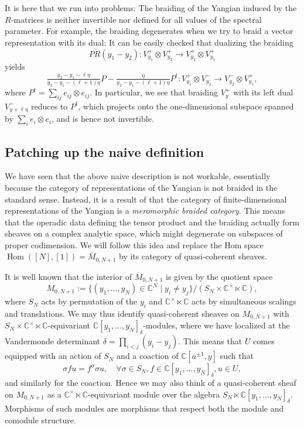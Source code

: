 \documentclass[11pt]{report}
\theoremstyle{definition}
\theoremstyle{remark}
\theoremstyle{remark}
\newcommand{\Hom}{\operatorname{Hom}}
\newcommand{\C}{\mathbb{C}}
\begin{document}
It is here that we run into problems: The braiding of the Yangian induced by the $R$-matrices is neither invertible nor defined for all values of the spectral parameter. For example, the braiding degenerates when we try to braid a vector representation with its dual: It can be easily checked that dualizing the braiding
\begin{equation*}
P \check R(y_1-y_2): V_{y_1}^+ \otimes V_{y_2}^+ \to V_{y_2}^+ \otimes V_{y_1}^+
\end{equation*}
yields
\begin{equation*}
\tfrac{y_2-y_1-\ell\eta}{y_2-y_1-(\ell+1)\eta} P - \tfrac{\eta}{y_2-y_1-(\ell+1)\eta} P^t: V_{y_1}^+ \otimes V_{y_2}^- \to V_{y_2}^- \otimes V_{y_1}^+,
\end{equation*}
where $P^t = \sum_{ij} e_{ij} \otimes e_{ij}$. In particular, we see that braiding $V_y^+$ with its left dual $V_{y+\ell\eta}^-$ reduces to $P^t$, which projects onto the one-dimensional subspace spanned by $\sum_i e_i \otimes e_i$, and is hence not invertible.

\subsection{Patching up the naive definition}

We have seen that the above naive description is not workable, essentially because the category of representations of the Yangian is not braided in the standard sense. Instead, it is a result of \cite{article:soibelman:1997} that the category of finite-dimensional representations of the Yangian is a \emph{meromorphic braided category}. This means that the operadic data defining the tensor product and the braiding actually form sheaves on a complex analytic space, which might degenerate on subspaces of proper codimension. We will follow this idea and replace the Hom space $\Hom([N],[1]) = \overline{M}_{0,N+1}$ by its category of quasi-coherent sheaves.

It is well known that the interior of $\overline{M}_{0,N+1}$ is given by the quotient space
\begin{equation*}
M_{0,N+1} := \{ (y_1,...,y_N) \in \C^N \mid y_i \neq y_j \}/(S_N \times \C^\times \ltimes \C),
\end{equation*}
where $S_N$ acts by permutation of the $y_i$ and $\C^\times \ltimes \C$ acts by simultaneous scalings and translations. We may thus identify quasi-coherent sheaves on $M_{0,N+1}$ with $S_N \times \C^\times \ltimes \C$-equivariant $\C[y_1,...,y_N]_\delta$-modules, where we have localized at the Vandermonde determinant $\delta = \prod_{i<j} (y_i-y_j)$. This means that $U$ comes equipped with an action of $S_N$ and a coaction of $\C[a^{\pm 1},y]$ such that
\begin{equation*}
\sigma f u = f^\sigma \sigma u, \quad \forall \sigma \in S_N, f \in \C[y_1,...,y_N]_\delta, u \in U,
\end{equation*}
and similarly for the coaction. Hence we may also think of a quasi-coherent sheaf on $M_{0,N+1}$ as a $\C^\times \ltimes \C$-equivariant module over the algebra $S_N \ltimes \C[y_1,...,y_N]_\delta$. Morphisms of such modules are morphisms that respect both the module and comodule structure.
\end{document}
